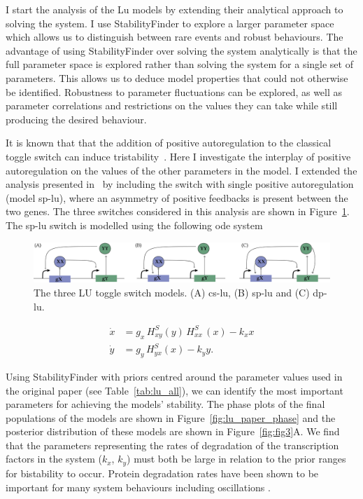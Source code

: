 I start the analysis of the Lu models by extending their analytical approach to solving the system. I use StabilityFinder to explore a larger parameter space which allows us to distinguish between rare events and robust behaviours. The advantage of using StabilityFinder over solving the system analytically is that the full parameter space is explored rather than solving the system for a single set of parameters. This allows us to deduce model properties that could not otherwise be identified. Robustness to parameter fluctuations can be explored, as well as parameter correlations and restrictions on the values they can take while still producing the desired behaviour. 

It is known that that the addition of positive autoregulation to the classical toggle switch can induce tristability~\autocite{Lu:2014kc}. Here I investigate the interplay of positive autoregulation on the values of the other parameters in the model. I extended the analysis presented in~\textcite{Lu:2014kc} by including the switch with single positive autoregulation (model \acrshort{sp-lu}), where an asymmetry of positive feedbacks is present between the two genes. The three switches considered in this analysis are shown in Figure~\ref{fig:lu_mods}. The \acrshort{sp-lu} switch is modelled using the following \acrshort{ode} system


\begin{figure}[tb]
\begin{center}
	\includegraphics[width=\textwidth]{../../chapters/chapterStabilityFinder/images/LU_diagrams.png}
	\caption[The three Lu toggle switch models.]{\label{fig:lu_mods} The three LU toggle switch models. (A) \acrshort{cs-lu}, (B) \acrshort{sp-lu} and (C) \acrshort{dp-lu}.   }
\end{center}
\end{figure}



\begin{align}
\dot{x} & = g_{x}\, H^{S}_{xy}(y)\, H^{S}_{xx}\,(x)-k_{x}x \\
\dot{y} & = g_{y}\,H^{S}_{yx}(x) - k_{y}y.
\end{align}


Using StabilityFinder with priors centred around the parameter values used in the original paper (see Table~\ref{tab:lu_all}), we can identify the most important parameters for achieving the models' stability. The phase plots of the final populations of the models are shown in Figure~\ref{fig:lu_paper_phase} and the posterior distribution of these models are shown in Figure~\ref{fig:fig3}A. We find that the parameters representing the rates of degradation of the transcription factors in the system ($k_x$, $k_y$) must both be large in relation to the prior ranges for bistability to occur. Protein degradation rates have been shown to be important for many system behaviours including oscillations \autocite{Woods:2016eh}.

